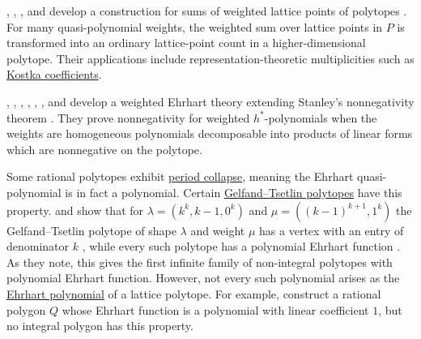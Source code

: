 , , , and
 develop a
\label{weightLifting} construction for sums
of weighted lattice points of polytopes \cite{LoeraEscobarKaplanWang2024x}.
For many quasi-polynomial weights, the weighted sum over lattice points in
$P$ is transformed into an ordinary lattice-point count in a higher-dimensional
polytope.  Their applications include representation-theoretic multiplicities
such as \hyperref[kostkaCoefficient]{Kostka coefficients}.

, , ,
, , ,
and  develop a weighted Ehrhart theory extending
Stanley's nonnegativity theorem \cite{BajoDavisLoeraGarberMoraJochemkoYu2024}.
They prove nonnegativity for weighted $h^*$-polynomials when the weights are
homogeneous polynomials decomposable into products of linear forms which are
nonnegative on the polytope.

Some rational polytopes exhibit \hyperref[periodCollapse]{period collapse},
meaning the Ehrhart quasi-polynomial is in fact a polynomial.
Certain \hyperref[gtKostkaEhrhart]{Gelfand--Tsetlin polytopes} have this property.
 and  show that for
$\lambda=(k^k,k-1,0^k)$ and $\mu=((k-1)^{k+1},1^k)$ the Gelfand--Tsetlin
polytope of shape $\lambda$ and weight $\mu$ has a vertex with an entry of
denominator $k$ \cite[Thm.~1.7]{DeLoeraMcAllister2004}, while every such
polytope has a polynomial Ehrhart function \cite[Prop.~2.6]{DeLoeraMcAllister2004}.
As they note, this gives the first infinite family of non-integral polytopes
with polynomial Ehrhart function.
However, not every such polynomial arises as the
\hyperref[ehrhartPolynomialDefinition]{Ehrhart polynomial} of a lattice
polytope.
For example, \cite{HaaseMcAllister2007} construct a rational polygon $Q$
whose Ehrhart function is a polynomial with linear coefficient $1$,
but no integral polygon has this property.

